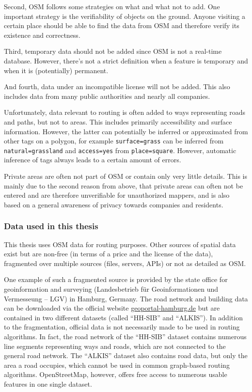 			Second, OSM follows some strategies on what and what not to add.
			One important strategy is the verifiability of objects on the ground.
			Anyone visiting a certain place should be able to find the data from OSM and therefore verify its existence and correctness.
			
			Third, temporary data should not be added since OSM is not a real-time database.
			However, there's not a strict definition when a feature is temporary and when it is (potentially) permanent.
			
			And fourth, data under an incompatible license will not be added.
			This also includes data from many public authorities and nearly all companies.
			
			Unfortunately, data relevant to routing is often added to ways representing roads and paths, but not to areas.
			This includes primarily accessibility and surface information.
			However, the latter can potentially be inferred or approximated from other tags on a polygon, for example \texttt{surface=grass} can be inferred from \texttt{natural=grassland} and \texttt{access=yes} from \texttt{place=square}.
			However, automatic inference of tags always leads to a certain amount of errors.
			
			Private areas are often not part of OSM or contain only very little details.
			This is mainly due to the second reason from above, that private areas can often not be entered and are therefore unverifiable for unauthorized mappers, and is also based on a general awareness of privacy towards companies and residents.
			
		\subsubsection{Data used in this thesis}
		
			This thesis uses OSM data for routing purposes.
			Other sources of spatial data exist but are non-free (in terms of a price and the license of the data), fragmented over multiple sources (files, servers, APIs) or not as detailed as OSM.
			
			One example of such a fragmented source is provided by the state office for geoinformation and surveying (Landesbetrieb für Geoinformationen und Vermesseung -- LGV) in Hamburg, Germany.
			The road network and building data can be downloaded via the official website \href{https://geoportal-hamburg.de}{geoportal-hamburg.de} but are contained in two different datasets (called \enquote{HH-SIB} and \enquote{ALKIS}).
			In addition to the fragmentation, official data is not necessarily made to be used in routing algorithms.
			In fact, the road network of the \enquote{HH-SIB} dataset contains numerous line segments representing ways and roads, which are not connected to the general road network.
			The \enquote{ALKIS} dataset also contains road data, but only the area a road occupies, which cannot be used in common graph-based routing algorithms.
			OpenStreetMap, however, offers free access to numerous usable features in one single dataset.
			
